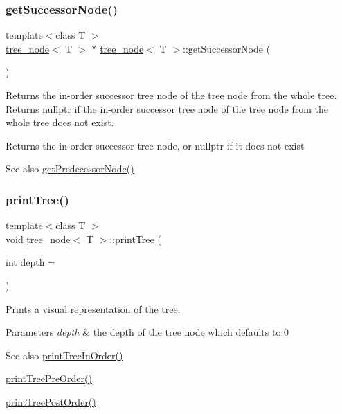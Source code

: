 \subsubsection{\texorpdfstring{get\+Successor\+Node()}{getSuccessorNode()}}
{\footnotesize\ttfamily template$<$class T $>$ \\
\hyperlink{classtree__node}{tree\+\_\+node}$<$ T $>$ $\ast$ \hyperlink{classtree__node}{tree\+\_\+node}$<$ T $>$\+::get\+Successor\+Node (\begin{DoxyParamCaption}{ }\end{DoxyParamCaption})}

Returns the in-\/order successor tree node of the tree node from the whole tree. Returns nullptr if the in-\/order successor tree node of the tree node from the whole tree does not exist. \begin{DoxyReturn}{Returns}
the in-\/order successor tree node, or nullptr if it does not exist 
\end{DoxyReturn}
\begin{DoxySeeAlso}{See also}
\hyperlink{classtree__node_a5cce6c37b00a6d899e371c334559310e}{get\+Predecessor\+Node()} 
\end{DoxySeeAlso}
\mbox{\label{classtree__node_a3a16e4e452fb27976139e59624d11846}} 
\subsubsection{\texorpdfstring{print\+Tree()}{printTree()}}
{\footnotesize\ttfamily template$<$class T $>$ \\
void \hyperlink{classtree__node}{tree\+\_\+node}$<$ T $>$\+::print\+Tree (\begin{DoxyParamCaption}\item[{int}]{depth = {} }\end{DoxyParamCaption})}

Prints a visual representation of the tree. 
\begin{DoxyParams}{Parameters}
{\em depth} & the depth of the tree node which defaults to 0 \\
\hline
\end{DoxyParams}
\begin{DoxySeeAlso}{See also}
\hyperlink{classtree__node_ae87818a195621d4defc1cde67e7219ee}{print\+Tree\+In\+Order()} 

\hyperlink{classtree__node_a2ca4e1521e6620bbe2418a9636a109a8}{print\+Tree\+Pre\+Order()} 

\hyperlink{classtree__node_a4bfdd2b618c15252fcfbeab46ca05861}{print\+Tree\+Post\+Order()} 
\end{DoxySeeAlso}
\mbox{\label{classtree__node_ae87818a195621d4defc1cde67e7219ee}} 
